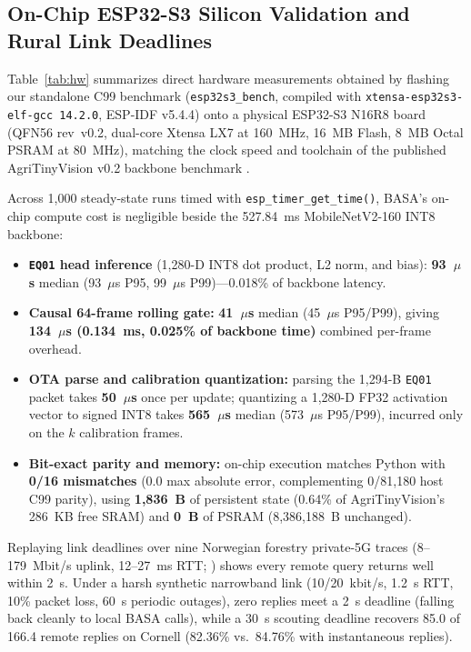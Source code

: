 \documentclass[preprint,12pt,authoryear]{elsarticle}
\begin{document}
\subsection{On-Chip ESP32-S3 Silicon Validation and Rural Link Deadlines}
\label{sec:hardware}

Table~\ref{tab:hw} summarizes direct hardware measurements obtained by flashing our standalone C99 benchmark (\texttt{esp32s3\_bench}, compiled with \texttt{xtensa-esp32s3-elf-gcc 14.2.0}, ESP-IDF v5.4.4) onto a physical ESP32-S3 N16R8 board (QFN56 rev~v0.2, dual-core Xtensa LX7 at 160~MHz, 16~MB Flash, 8~MB Octal PSRAM at 80~MHz), matching the clock speed and toolchain of the published AgriTinyVision v0.2 backbone benchmark \citep{agri}.

Across 1,000 steady-state runs timed with \texttt{esp\_timer\_get\_time()}, BASA's on-chip compute cost is negligible beside the 527.84~ms MobileNetV2-160 INT8 backbone:
\begin{itemize}
  \item \textbf{\texttt{EQ01} head inference} (1,280-D INT8 dot product, L2 norm, and bias): \textbf{93~$\mu$s} median (93~$\mu$s P95, 99~$\mu$s P99)---0.018\% of backbone latency.
  \item \textbf{Causal 64-frame rolling gate:} \textbf{41~$\mu$s} median (45~$\mu$s P95/P99), giving \textbf{134~$\mu$s (0.134~ms, 0.025\% of backbone time)} combined per-frame overhead.
  \item \textbf{OTA parse and calibration quantization:} parsing the 1,294-B \texttt{EQ01} packet takes \textbf{50~$\mu$s} once per update; quantizing a 1,280-D FP32 activation vector to signed INT8 takes \textbf{565~$\mu$s} median (573~$\mu$s P95/P99), incurred only on the $k$ calibration frames.
  \item \textbf{Bit-exact parity and memory:} on-chip execution matches Python with \textbf{0/16 mismatches} ($0.0$ max absolute error, complementing 0/81,180 host C99 parity), using \textbf{1,836~B} of persistent state (0.64\% of AgriTinyVision's 286~KB free SRAM) and \textbf{0~B} of PSRAM (8,386,188~B unchanged).
\end{itemize}

Replaying link deadlines over nine Norwegian forestry private-5G traces (8--179~Mbit/s uplink, 12--27~ms RTT; \citealp{forest}) shows every remote query returns well within 2~s. Under a harsh synthetic narrowband link (10/20~kbit/s, 1.2~s RTT, 10\% packet loss, 60~s periodic outages), zero replies meet a 2~s deadline (falling back cleanly to local BASA calls), while a 30~s scouting deadline recovers 85.0 of 166.4 remote replies on Cornell (82.36\% vs.\ 84.76\% with instantaneous replies).
\end{document}

